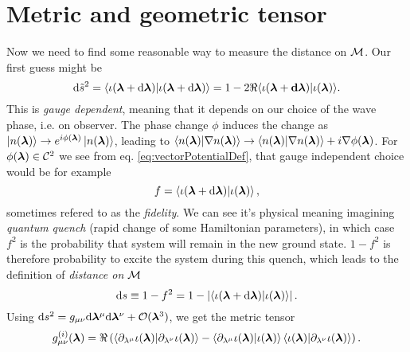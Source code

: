 \section{Metric and geometric tensor}
Now we need to find some reasonable way to measure the distance on $\mathcal{M}$. Our first guess might be
\begin{equation}
    \mathrm{d} \tilde{s}^2 = \braket{\iota(\bm{{\bm\lambda}}+\mathrm{d}\bm{{\bm\lambda}})|\iota(\bm{{\bm\lambda}}+\mathrm{d}\bm{{\bm\lambda}})} = 1-2\Re{\braket{\iota(\bm{{\bm\lambda}}+\bm{\ensuremath{\mathrm{d}}}{\bm\lambda})|\iota(\bm{{\bm\lambda}})}}.
\end{equation}
This is \emph{gauge dependent}, meaning that it depends on our choice of the wave phase, i.e. on observer. The phase change $\phi$ induces the change as $\ket{n({\bm\lambda})}\rightarrow e^{i\phi({\bm\lambda})} \ket{n({\bm\lambda})}$, leading to $\braket{n({\bm\lambda})|\nabla n({\bm\lambda})}\rightarrow \braket{n({\bm\lambda})|\nabla n({\bm\lambda})} + i\nabla \phi({\bm\lambda})$. For $\phi({\bm\lambda})\in \mathcal C^2$ we see from eq. \ref{eq:vectorPotentialDef}, that gauge independent choice would be for example 
\begin{equation}
    f=\braket{\iota(\bm{{\bm\lambda}}+\mathrm{d}\bm{{\bm\lambda}})|\iota(\bm{{\bm\lambda}})},
\end{equation}
sometimes refered to as the \emph{fidelity}. We can see it's physical meaning imagining \emph{quantum quench} (rapid change of some Hamiltonian parameters), in which case $f^2$ is the probability that system will remain in the new ground state. $1-f^2$ is therefore probability to excite the system during this quench, which leads to the definition of \emph{distance on $\mathcal{M}$}
\begin{equation}
    \mathrm{d} s \equiv 1-f^2= 1-\left|\braket{\iota(\bm{{\bm\lambda}}+\mathrm{d}\bm{{\bm\lambda}})|\iota(\bm{{\bm\lambda}})}\right|.
\end{equation}
Using $\mathrm{d} s^2 = g_{\mu\nu}\mathrm{d} {\bm\lambda}^\mu \mathrm{d}{\bm\lambda}^\nu+\mathcal{O}({\bm\lambda}^3)$, we get the metric tensor
\begin{equation}
    g_{\mu\nu}^{(i)}(\bm{{\bm\lambda}}) = \Re\left(\braket{\partial_{\lambda^\mu}\iota(\bm{{\bm\lambda}})|\partial_{\lambda^\nu}\iota(\bm{{\bm\lambda}})} - \braket{\partial_{\lambda^\mu}\iota(\bm{{\bm\lambda}})|\iota(\bm{{\bm\lambda}})}\braket{\iota(\bm{{\bm\lambda}})|\partial_{\lambda^\nu}\iota(\bm{{\bm\lambda}})}\right).
    \label{eq:geom.tensorDefinition}
\end{equation}

